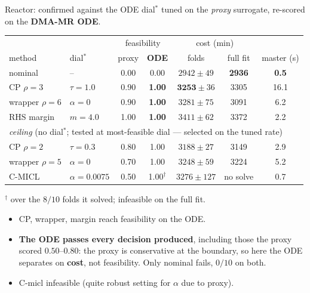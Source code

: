 \documentclass{beamer}
\begin{document}
\begin{frame}{Reactor: confirmed against the ODE}
    \footnotesize
    dial$^\ast$ tuned on the \emph{proxy} surrogate,
    re-scored on the \textbf{DMA-MR ODE}.
    {\scriptsize\setlength{\tabcolsep}{4pt}
    \begin{tabular}{llcc|cc|c}
        \toprule
        & & \multicolumn{2}{c|}{feasibility} & \multicolumn{2}{c|}{cost (min)} & \\
        method & dial$^\ast$ & proxy & \textbf{ODE} & folds & full fit & master (s) \\
        \midrule
        nominal               & --            & 0.00 & 0.00          & $2942\pm49$ & \textbf{2936} & \textbf{0.5} \\
        CP $\rho{=}3$         & $\tau=1.0$    & 0.90 & \textbf{1.00} & $\mathbf{3253}\pm36$ & 3305 & 16.1 \\
        wrapper $\rho{=}6$    & $\alpha=0$    & 0.90 & \textbf{1.00} & $3281\pm75$ & 3091 & 6.2 \\
        RHS margin            & $m=4.0$       & 1.00 & \textbf{1.00} & $3411\pm62$ & 3372 & 2.2 \\
        \midrule
        \multicolumn{7}{l}{\emph{ceiling} (no dial$^\ast$; tested at most-feasible dial --- selected on the tuned rate)} \\
        CP $\rho{=}2$         & $\tau=0.3$    & 0.80 & 1.00 & $3188\pm27$ & 3149 & 2.9 \\
        wrapper $\rho{=}5$    & $\alpha=0$    & 0.70 & 1.00 & $3248\pm59$ & 3224 & 5.2 \\
        C-MICL                & $\alpha=0.0075$ & 0.50 & 1.00$^{\dagger}$ & $3276\pm127$ & no solve & 0.7 \\
        \bottomrule
    \end{tabular}}
    \par{\scriptsize $^{\dagger}$ over the $8/10$ folds it solved; infeasible on the full fit.}
    \begin{itemize}\footnotesize
        \item CP, wrapper, margin reach feasibility on the ODE.
        \item \textbf{The ODE passes every decision produced}, including those
              the proxy scored $0.50$--$0.80$: the proxy is conservative at the
              boundary, so here the ODE separates on \textbf{cost}, not
              feasibility. Only nominal fails, $0/10$ on both.
        \item C-micl infeasible (quite robust setting for $\alpha$ due to proxy).
    \end{itemize}
\end{frame}
\end{document}
